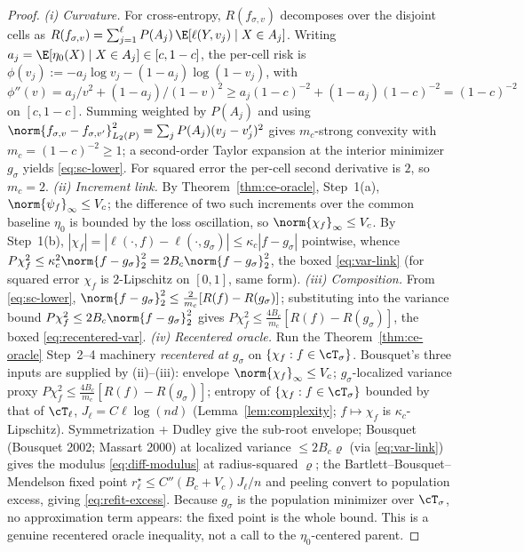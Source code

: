 \begin{proof}
\emph{(i) Curvature.} For cross-entropy, $R(f_{\sigma,v})$ decomposes over the
disjoint cells as $R(f_{\sigma,v})=\sum_{j=1}^\ell P(A_j)\,\E[\ell(Y,v_j)\mid
X\in A_j]$. Writing $a_j=\E[\eta_0(X)\mid X\in A_j]\in[c,1-c]$, the per-cell risk
is $\phi(v_j):=-a_j\log v_j-(1-a_j)\log(1-v_j)$, with
$\phi''(v)=a_j/v^2+(1-a_j)/(1-v)^2\ge a_j(1-c)^{-2}+(1-a_j)(1-c)^{-2}=(1-c)^{-2}$
on $[c,1-c]$. Summing weighted by $P(A_j)$ and using
$\norm{f_{\sigma,v}-f_{\sigma,v'}}_{L_2(P)}^2=\sum_j P(A_j)(v_j-v_j')^2$ gives
$m_c$-strong convexity with $m_c=(1-c)^{-2}\ge1$; a second-order Taylor expansion
at the interior minimizer $g_\sigma$ yields \eqref{eq:sc-lower}. For squared
error the per-cell second derivative is $2$, so $m_c=2$.
\emph{(ii) Increment link.} By Theorem~\ref{thm:ce-oracle}, Step~1(a),
$\norm{\psi_f}_\infty\le V_c$; the difference of two such increments over the
common baseline $\eta_0$ is bounded by the loss oscillation, so
$\norm{\chi_f}_\infty\le V_c$. By Step~1(b),
$|\chi_f|=|\ell(\cdot,f)-\ell(\cdot,g_\sigma)|\le\kappa_c|f-g_\sigma|$ pointwise,
whence $P\chi_f^2\le\kappa_c^2\norm{f-g_\sigma}_2^2=2B_c\norm{f-g_\sigma}_2^2$,
the boxed \eqref{eq:var-link} (for squared error $\chi_f$ is $2$-Lipschitz on
$[0,1]$, same form).
\emph{(iii) Composition.} From \eqref{eq:sc-lower},
$\norm{f-g_\sigma}_2^2\le\tfrac{2}{m_c}[R(f)-R(g_\sigma)]$; substituting into the
variance bound $P\chi_f^2\le 2B_c\norm{f-g_\sigma}_2^2$ gives
$P\chi_f^2\le\tfrac{4B_c}{m_c}[R(f)-R(g_\sigma)]$, the boxed
\eqref{eq:recentered-var}.
\emph{(iv) Recentered oracle.} Run the Theorem~\ref{thm:ce-oracle} Step~2--4
machinery \emph{recentered at $g_\sigma$} on $\{\chi_f:f\in\cT_\sigma\}$. Bousquet's
three inputs are supplied by (ii)--(iii): envelope $\norm{\chi_f}_\infty\le V_c$;
$g_\sigma$-localized variance proxy $P\chi_f^2\le\tfrac{4B_c}{m_c}[R(f)-R(g_\sigma)]$;
entropy of $\{\chi_f:f\in\cT_\sigma\}$ bounded by that of $\cT_\ell$,
$J_\ell=C\ell\log(nd)$ (Lemma~\ref{lem:complexity}; $f\mapsto\chi_f$ is
$\kappa_c$-Lipschitz). Symmetrization + Dudley give the sub-root envelope; Bousquet
(Bousquet 2002; Massart 2000) at localized variance $\le 2B_c\varrho$ (via
\eqref{eq:var-link}) gives the modulus \eqref{eq:diff-modulus} at radius-squared
$\varrho$; the Bartlett--Bousquet--Mendelson fixed point $r^\star_\ell\le
C''(B_c+V_c)J_\ell/n$ and peeling convert to population excess, giving
\eqref{eq:refit-excess}. Because $g_\sigma$ is the population minimizer over
$\cT_\sigma$, no approximation term appears: the fixed point is the whole bound.
This is a genuine recentered oracle inequality, not a call to the $\eta_0$-centered
parent.
\end{proof}

